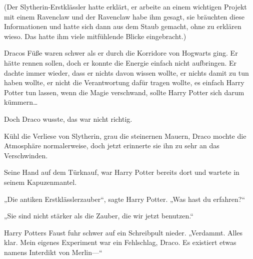 (Der Slytherin-Erstklässler hatte erklärt, er arbeite an einem wichtigen Projekt mit einem Ravenclaw und der Ravenclaw habe ihm gesagt, sie bräuchten diese Informationen und hatte sich dann aus dem Staub gemacht, ohne zu erklären wieso. Das hatte ihm viele mitfühlende Blicke eingebracht.)

Dracos Füße waren schwer als er durch die Korridore von Hogwarts ging. Er hätte rennen sollen, doch er konnte die Energie einfach nicht aufbringen. Er dachte immer wieder, dass er nichts davon wissen wollte, er nichts damit zu tun haben wollte, er nicht die Verantwortung dafür tragen wollte, es einfach Harry Potter tun lassen, wenn die Magie verschwand, sollte Harry Potter sich darum kümmern…

Doch Draco wusste, das war nicht richtig.

Kühl die Verliese von Slytherin, grau die steinernen Mauern, Draco mochte die Atmosphäre normalerweise, doch jetzt erinnerte sie ihn zu sehr an das Verschwinden.

Seine Hand auf dem Türknauf, war Harry Potter bereits dort und wartete in seinem Kapuzenmantel.

„Die antiken Erstklässlerzauber“, sagte Harry Potter.
„Was hast du erfahren?“

„Sie sind nicht stärker als die Zauber, die wir jetzt benutzen.“

Harry Potters Faust fuhr schwer auf ein Schreibpult nieder.
„Verdammt. Alles klar. Mein eigenes Experiment war ein Fehlschlag, Draco. Es existiert etwas namens Interdikt von Merlin—“

